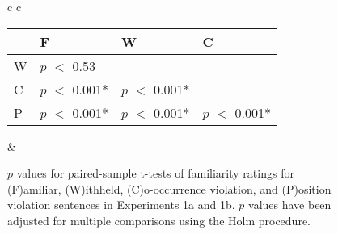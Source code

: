 \begin{figure}[h]
\begin{center}
\begin{tabular}{ c c}
{        %




      \small
      \begin{tabular}{| l | l |  l | l |}
        \hline
        & F                            & W                         & C \\
        \hline
        W &  $p$ $<$ 0.53  &                           &\\
        \hline
        C &  $p$ $<$ 0.001*  &  $p$ $<$ 0.001*   &\\
        \hline
        P &  $p$ $<$ 0.001* &  $p$ $<$ 0.001*  &  $p$ $<$ 0.001*\\
        \hline
      \end{tabular}
      } & \\

    \end{tabular}
    \caption{$p$ values for paired-sample t-tests of familiarity ratings for (F)amiliar, (W)ithheld, (C)o-occurrence violation, and (P)osition violation sentences in Experiments 1a and 1b. $p$ values have been adjusted for multiple comparisons using the Holm procedure.}
    \label{familiarity-ordering-t-tests-1a1b}
  \end{center}
\end{figure}


